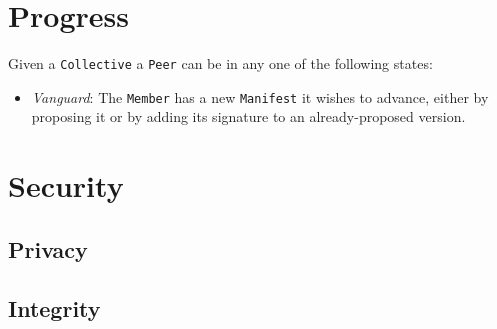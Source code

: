 \section{Progress}
Given a \texttt{Collective} a \texttt{Peer} can be in any
one of the following states:
\begin{itemize}
  \item \emph{Vanguard}: The \texttt{Member} has a new \texttt{Manifest} it
    wishes to advance, either by proposing it or by adding its signature to
    an already-proposed version.
\end{itemize}
\section{Security}
\subsection{Privacy}
\subsection{Integrity}
